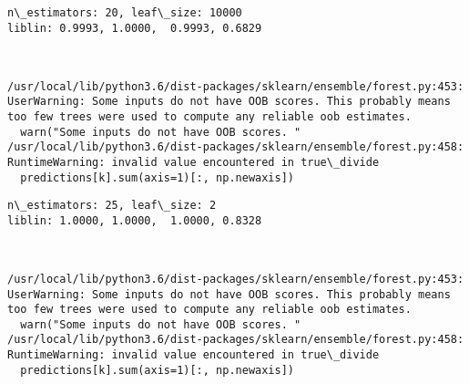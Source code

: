\documentclass[11pt]{article}
\begin{document}
    \begin{Verbatim}[commandchars=\\\{\}]
n\_estimators: 20, leaf\_size: 10000
liblin: 0.9993, 1.0000,  0.9993, 0.6829 



    \end{Verbatim}

    \begin{Verbatim}[commandchars=\\\{\}]
/usr/local/lib/python3.6/dist-packages/sklearn/ensemble/forest.py:453: UserWarning: Some inputs do not have OOB scores. This probably means too few trees were used to compute any reliable oob estimates.
  warn("Some inputs do not have OOB scores. "
/usr/local/lib/python3.6/dist-packages/sklearn/ensemble/forest.py:458: RuntimeWarning: invalid value encountered in true\_divide
  predictions[k].sum(axis=1)[:, np.newaxis])

    \end{Verbatim}

    \begin{Verbatim}[commandchars=\\\{\}]
n\_estimators: 25, leaf\_size: 2
liblin: 1.0000, 1.0000,  1.0000, 0.8328 



    \end{Verbatim}

    \begin{Verbatim}[commandchars=\\\{\}]
/usr/local/lib/python3.6/dist-packages/sklearn/ensemble/forest.py:453: UserWarning: Some inputs do not have OOB scores. This probably means too few trees were used to compute any reliable oob estimates.
  warn("Some inputs do not have OOB scores. "
/usr/local/lib/python3.6/dist-packages/sklearn/ensemble/forest.py:458: RuntimeWarning: invalid value encountered in true\_divide
  predictions[k].sum(axis=1)[:, np.newaxis])

    \end{Verbatim}
\end{document}
